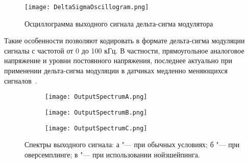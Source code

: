 \begin{figure}[ht]
	\centering
	\texttt{[image: DeltaSigmaOscillogram.png]}  
	\caption{Осциллограмма выходного сигнала дельта-сигма модулятора}
	\label{fig:DeltaSigmaOscillogram}
\end{figure}

Такие особенности позволяют кодировать в формате дельта-сигма модуляции сигналы с частотой от 0 до 100 кГц. В частности, прямоугольное аналоговое напряжение и уровни постоянного напряжения, последнее актуально при применении дельта-сигма модуляции в датчиках медленно меняющихся сигналов~\cite{KitE_DeltaSigma}.

\begin{figure}[ht]
\centering
  \begin{subfigure}[b]{0.45\textwidth} 
    \centering
    \texttt{[image: OutputSpectrumA.png]}  
    \caption{}
  \end{subfigure}
  \begin{subfigure}[b]{0.45\textwidth} 
    \centering
    \texttt{[image: OutputSpectrumB.png]}  
    \caption{}
  \end{subfigure}
  \begin{subfigure}[b]{0.45\textwidth} 
    \centering
    \texttt{[image: OutputSpectrumC.png]}  
    \caption{}
  \end{subfigure}
  \caption{ Спектры выходного сигнала:
			а "--- при обычных условиях;
            б "--- при оверсемплинге;
			в "--- при использовании нойзшейпинга.}
  \label{fig:OutputSpectrum}
\end{figure}

